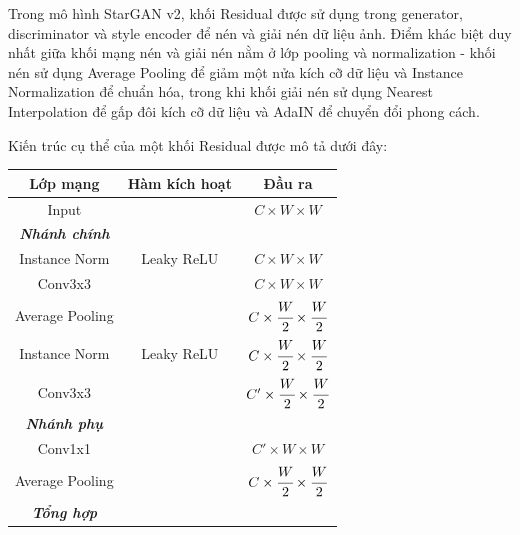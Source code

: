 \documentclass[12pt]{extreport}
\begin{document}
Trong mô hình StarGAN v2, khối Residual được sử dụng trong generator, discriminator và style encoder để nén và giải nén dữ liệu ảnh. Điểm khác biệt duy nhất giữa khối mạng nén và giải nén nằm ở lớp pooling và normalization - khối nén sử dụng Average Pooling để giảm một nửa kích cỡ dữ liệu và Instance Normalization để chuẩn hóa, trong khi khối giải nén sử dụng Nearest Interpolation để gấp đôi kích cỡ dữ liệu và AdaIN để chuyển đổi phong cách.

Kiến trúc cụ thể của một khối Residual được mô tả dưới đây:

\begin{table}[H]
    \centering
    \begin{subtable}[H]{.48\textwidth}
        \begin{adjustbox}{width=\textwidth}
            \begin{tabular}{c c c}
                Lớp mạng        & Hàm kích hoạt & Đầu ra                                          \\
                \hline
                Input           &               & $ C \times W \times W $                         \\
                \hline
                \textbf{\textit{Nhánh chính}}                                                     \\
                Instance Norm   & Leaky ReLU    & $ C \times W \times W $                         \\
                Conv3x3         &               & $ C \times W  \times W $                        \\
                Average Pooling &               & $ C \times \cfrac{W}{2}  \times \cfrac{W}{2} $  \\
                Instance Norm   & Leaky ReLU    & $ C \times \cfrac{W}{2}  \times \cfrac{W}{2} $  \\
                Conv3x3         &               & $ C' \times \cfrac{W}{2}  \times \cfrac{W}{2} $ \\
                \hline
                \textbf{\textit{Nhánh phụ}}                                                       \\
                Conv1x1         &               & $ C' \times W  \times W $                       \\
                Average Pooling &               & $ C \times \cfrac{W}{2}  \times \cfrac{W}{2} $  \\
                \hline
                \textbf{\textit{Tổng hợp}}                                                        \\

\end{tabular}
\end{adjustbox}
\end{subtable}
\end{table}
\end{document}
